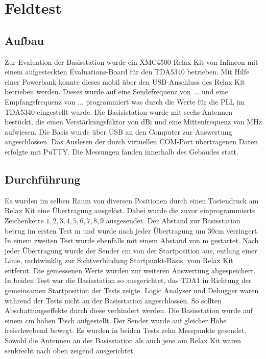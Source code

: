 \chapter{Feldtest}
\label{sec:Feldtest}
\pagestyle{scrheadings}
\section{Aufbau}
Zur Evaluation der Basisstation wurde ein  XMC4500 Relax Kit von Infineon mit einem aufgesteckten Evaluations-Board für den TDA5340 betrieben. Mit Hilfe einer Powerbank konnte dieses mobil über den \ac{USB}-Anschluss des Relax Kit betrieben werden. %
Dieses wurde auf eine Sendefrequenz von $...$ und eine Empfangsfrequenz von $...$ programmiert was durch die Werte für die \ac{PLL} im TDA5340 eingestellt wurde. 
Die Basisistation wurde mit sechs Antennen bestückt, die einen Verstärkungsfaktor von \unit[3,6]{dBi} und eine Mittenfrequenz von \unit[868]{MHz} aufwiesen. Die Basis wurde über \ac{USB} an den Computer zur Auswertung angeschlossen. Das Auslesen der durch virtuellen COM-Port übertragenen Daten erfolgte mit  PuTTY. Die Messungen fanden innerhalb des Gebäudes statt.


\section{Durchführung}
Es wurden  im selben Raum von diversen Positionen durch einen Tastendruck am Relax Kit eine Übertragung ausgelöst. Dabei wurde die zuvor einprogrammierte Zeichenkette $1,2,3,4,5,6,7,8,9$ ausgesendet. Der Abstand zur Basisstation betrug im ersten Test  \unit[3,30]{m} und wurde nach jeder Übertragung um $30$cm verringert. 
In einem zweiten Test wurde ebenfalls mit einem Abstand von \unit[3,30]{m} gestartet.  Nach jeder Übertragung wurde der Sender \unit[30]{cm}  von der Startposition aus, entlang einer  Linie, rechtwinklig zur Sichtverbindung Startpunkt-Basis, vom Relax Kit entfernt. Die gemessenen Werte wurden zur weiteren Auswertung abgespeichert.
In beiden Test war die Basisstation so ausgerichtet, das TDA1 in Richtung der gemeinsamen Startposition der Tests zeigte. Logic Analyser und Debugger waren während der Tests nicht an der Basisstation angeschlossen. So sollten Abschattungseffekte durch diese verhindert werden. Die Basisstation wurde auf einem \unit[70]{cm} hohen Tisch aufgestellt. Der Sender wurde auf gleicher Höhe freischwebend bewegt. Es wurden in beiden Tests zehn Messpunkte gesendet. Sowohl die Antennen an der Basisstation als auch jene am Relax Kit waren senkrecht nach oben zeigend ausgerichtet.



